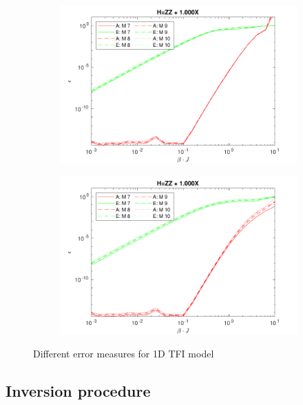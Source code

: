 \begin{figure}[h!]
    \begin{subfigure}[]{\linewidth}
        \includegraphics[width=\textwidth]{Figuren/benchmarking/comp_M_cycl.pdf}
    \end{subfigure}
    \begin{subfigure}[]{\linewidth}
        \includegraphics[width=\textwidth]{Figuren/benchmarking/Comp_M_lin.pdf}
    \end{subfigure}
    \caption{ Different error measures for 1D \Gls{TFI} model }
    \label{benchmarking:systemsize}
\end{figure}

\subsection{Inversion procedure}\label{subsec:inversion_procedure}

